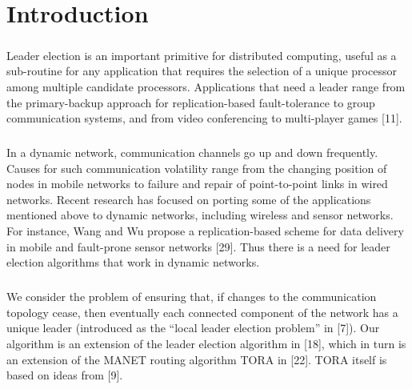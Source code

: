 \chapter{Introduction}
\paragraph{}Leader election is an important primitive for distributed computing, useful as a sub-routine for any application that requires the selection of a unique processor among multiple candidate processors. Applications that need a leader range from the primary-backup approach for replication-based fault-tolerance to group communication systems\cite{26}, and from video conferencing to multi-player games [11].
\paragraph{}In a dynamic network, communication channels go up and down frequently. Causes for such communication volatility range from the changing position of nodes in mobile networks to failure and repair of point-to-point links in wired networks. Recent research has focused on porting some of the applications mentioned above to dynamic networks, including wireless and sensor networks. For instance, Wang and Wu propose a replication-based scheme for data delivery in mobile and fault-prone sensor networks [29]. Thus there is a need for leader election algorithms that work in dynamic networks.
\paragraph{}We consider the problem of ensuring that, if changes to the communication topology cease, then eventually each connected component of the network has a unique leader (introduced as the “local leader election problem” in [7]). Our algorithm is an extension of the leader election algorithm in [18], which in turn is an extension of the MANET routing algorithm TORA in [22]. TORA itself is based on ideas from [9].
